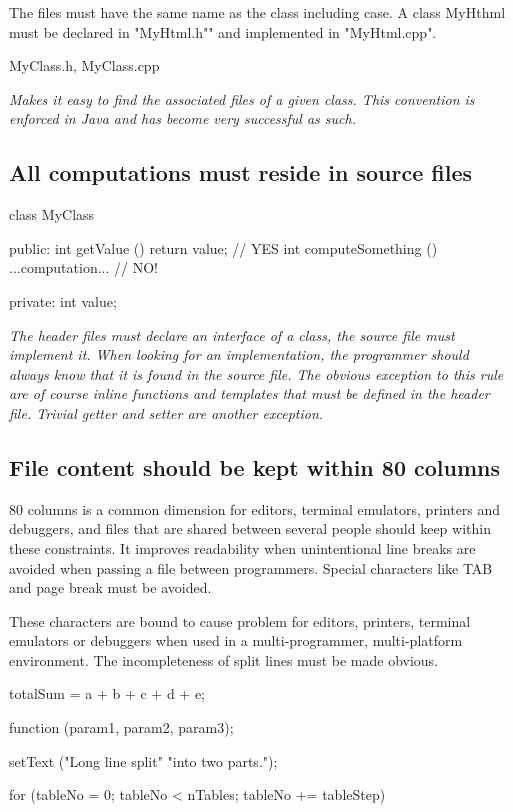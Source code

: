 \documentclass[a4paper,11pt,oneside]{scrbook}
\newcommand{\guideline}[1]{{\subsection{#1}}}
\newcommand{\motivation}[1]{{\normalfont \itshape #1}}
\newcommand{\trfile}[1]{"#1"}
\newcommand{\trcode}[1]{{\normalfont \ttfamily #1}}
\begin{document}
The files must have the same name as the class including case. A class
\trcode{MyHthml} must be declared in \trfile{MyHtml.h"} and implemented in
\trfile{MyHtml.cpp}.

\begin{code}
  MyClass.h, MyClass.cpp 
\end{code}

\motivation{ 
  Makes it easy to find the associated files of a given class. This convention
  is enforced in Java and has become very successful as such.
}

\guideline{All computations must reside in source files}

\begin{code}
  class MyClass { 
    public: 
      int getValue () {return value;} // YES
      int computeSomething () {...computation...} // NO! 

    private: 
      int value; 
  } 
\end{code}

\motivation{ 
  The header files must declare an interface of a class, the source file must
  implement it. When looking for an implementation, the programmer should always
  know that it is found in the source file. The obvious exception to this rule
  are of course inline functions and templates that must be defined in the
  header file. Trivial getter and setter are another exception.
}

\guideline{File content should be kept within 80 columns}

80 columns is a common dimension for editors, terminal emulators, printers and
debuggers, and files that are shared between several people should keep within
these constraints. It improves readability when unintentional line breaks are
avoided when passing a file between programmers.  Special characters like TAB
and page break must be avoided.

These characters are bound to cause problem for editors, printers, terminal
emulators or debuggers when used in a multi-programmer, multi-platform
environment.  The incompleteness of split lines must be made obvious.

\begin{code}
  totalSum = a + b + c
           + d + e;

  function (param1, param2,
           param3);

  setText ("Long line split"
           "into two parts.");

  for (tableNo = 0; tableNo < nTables;
       tableNo += tableStep) 
\end{code}
\end{document}
